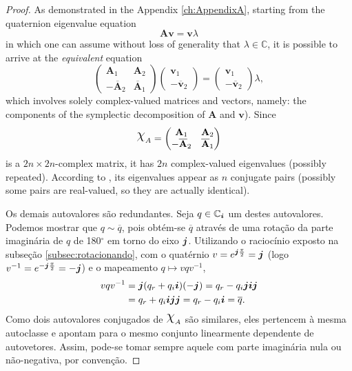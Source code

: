 \begin{proof}
As demonstrated in the Appendix \ref{ch:AppendixA}, starting from the quaternion eigenvalue equation
\begin{equation}
\mathbf{A} \mathbf{v} = \mathbf{v} \lambda
\end{equation}
in which one can assume without loss of generality that $ \lambda \in \mathbb{C} $, it is possible to arrive at the \emph{equivalent} equation
\begin{equation}
\label{eq:eigvalueequation}
\begin{pmatrix}
\mathbf{A}_1 & \mathbf{A}_2\\ 
- \overline{\mathbf{A}}_2 & \overline{\mathbf{A}}_1
\end{pmatrix}
\begin{pmatrix}
\mathbf{v}_1 \\ 
- \overline{\mathbf{v}}_2
\end{pmatrix} =
\begin{pmatrix}
\mathbf{v}_1 \\ 
- \overline{\mathbf{v}}_2
\end{pmatrix}
\lambda,
\end{equation}
which involves solely complex-valued matrices and vectors, namely: the components of the symplectic decomposition of $ \mathbf{A} $ and $ \mathbf{v} $). Since
\begin{equation}
\rchi_A = 
\begin{pmatrix}
\mathbf{A}_1 & \mathbf{A}_2\\ 
- \overline{\mathbf{A}}_2 & \overline{\mathbf{A}}_1
\end{pmatrix}
\end{equation}
is a $ 2n \times 2n $-complex matrix, it has $ 2n $ complex-valued eigenvalues (possibly repeated). According to \cite[Theorem 5]{lee1948eigenvalues}, its eigenvalues appear as $ n $ conjugate pairs (possibly some pairs are real-valued, so they are actually identical).

Os demais autovalores s\~ao redundantes. Seja $ q \in \mathbb{C}_{\boldsymbol{i}}$ um destes autovalores. Podemos mostrar que $ q \sim \overline{q} $, pois obt\'em-se $ \overline{q} $ atrav\'es de uma rota\c c\~ao da parte imagin\'aria de $ q $ de 180$ ^\circ $ em torno do eixo $ \boldsymbol{j} $. Utilizando o racioc\'inio exposto na subse\c c\~ao \ref{subsec:rotacionando}, com o quat\'ernio $ v = e^{\boldsymbol{j} \frac{\pi}{2}} = \boldsymbol{j} $ (logo $ v^{-1} = e^{- \boldsymbol{j} \frac{\pi}{2}} = -\boldsymbol{j} $) e o mapeamento $ q \mapsto v q v^{-1} $,
\begin{equation}
\begin{aligned}
v q v^{-1} &= \boldsymbol{j} (q_r + q_i \boldsymbol{i}) (-\boldsymbol{j}) = q_r - q_i \boldsymbol{j} \boldsymbol{i} \boldsymbol{j}\\
&= q_r + q_i \boldsymbol{i} \boldsymbol{j} \boldsymbol{j} = q_r - q_i \boldsymbol{i} = \overline{q}.
\end{aligned}
\end{equation}
Como dois autovalores conjugados de $ \rchi_A $ s\~ao similares, eles pertencem \`a mesma autoclasse e apontam para o mesmo conjunto linearmente dependente de autovetores. Assim, pode-se tomar sempre aquele com parte imagin\'aria nula ou n\~ao-negativa, por conven\c c\~ao.
\end{proof}

